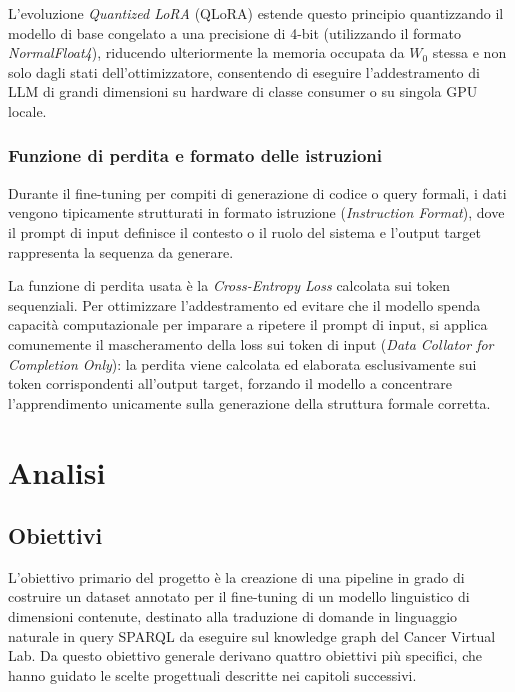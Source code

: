 \documentclass[12pt,a4paper,openright,twoside]{book}
\begin{document}
L'evoluzione \textit{Quantized LoRA} (QLoRA) estende questo principio
quantizzando il modello di base congelato a una precisione di 4-bit (utilizzando
il formato \textit{NormalFloat4}), riducendo ulteriormente la memoria occupata
da $W_0$ stessa e non solo dagli stati dell'ottimizzatore, consentendo di
eseguire l'addestramento di LLM di grandi dimensioni su hardware di classe
consumer o su singola GPU locale.

\subsection{Funzione di perdita e formato delle istruzioni}
Durante il fine-tuning per compiti di generazione di codice o query formali, i
dati vengono tipicamente strutturati in formato istruzione (\textit{Instruction
    Format}), dove il prompt di input definisce il contesto o il ruolo del sistema e
l'output target rappresenta la sequenza da generare.

La funzione di perdita usata è la \textit{Cross-Entropy Loss} calcolata sui
token sequenziali. Per ottimizzare l'addestramento ed evitare che il modello
spenda capacità computazionale per imparare a ripetere il prompt di input, si
applica comunemente il mascheramento della loss sui token di input (\textit{Data
    Collator for Completion Only}): la perdita viene calcolata ed elaborata
esclusivamente sui token corrispondenti all'output target, forzando il modello a
concentrare l'apprendimento unicamente sulla generazione della struttura formale
corretta.

\chapter{Analisi}
\label{chap:analisi}


\section{Obiettivi}

L'obiettivo primario del progetto è la creazione di una pipeline in grado di
costruire un dataset annotato per il fine-tuning di un modello linguistico di
dimensioni contenute, destinato alla traduzione di domande in linguaggio
naturale in query SPARQL da eseguire sul knowledge graph del Cancer Virtual Lab.
Da questo obiettivo generale derivano quattro obiettivi più specifici, che hanno
guidato le scelte progettuali descritte nei capitoli successivi.
\end{document}
